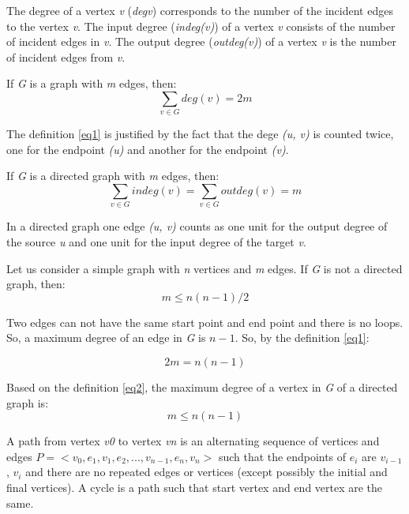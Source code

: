 \documentclass[a4paper]{article}
\begin{document}
    The degree of a vertex \emph{v} (\emph{deg{v}}) corresponds to 
    the number of the incident edges to the vertex \emph{v}.
    The input degree (\emph{indeg(v)}) of a vertex \emph{v} consists 
    of the number of incident edges in \emph{v}.
    The output degree (\emph{outdeg(v)}) of a vertex \emph{v} is the 
    number of incident edges from \emph{v}.

    If \emph{G} is a graph with \emph{m} edges, then:
    \begin{equation} \label{eq1}
        \sum_{v \in G} deg(v) = 2m
    \end{equation}

    The definition \ref{eq1} is justified by the fact that the dege 
    \emph{(u, v)} is counted twice, one for the endpoint \emph{(u)} and 
    another for the endpoint \emph{(v)}.

    If \emph{G} is a directed graph with \emph{m} edges, then:
    \begin{equation} \label{eq2}
        \sum_{v \in G} indeg(v) = \sum_{v \in G} outdeg(v) = m
    \end{equation}

    In a directed graph one edge \emph{(u, v)} counts as one unit 
    for the output degree of the source \emph{u} and one unit for
    the input degree of the target \emph{v}.

    Let us consider a simple graph with \emph{n} vertices and \emph{m} 
    edges. If \emph{G} is not a directed graph, then:
    \begin{equation} \label{eq3}
        m \le n(n - 1) / 2 
    \end{equation}

    Two edges can not have the same start point and end point and there 
    is no loops. So, a maximum degree of an edge in \emph{G} is $n - 1$. 
    So, by the definition \ref{eq1}:

    \begin{equation} \label{eq4}
        2m = n(n - 1)
    \end{equation}

    Based on the definition \ref{eq2}, the maximum degree of a vertex in \emph{G}
    of a directed graph is:
    \begin{equation}
        m \le n(n-1)
    \end{equation}
    


    A path from vertex \emph{v0} to vertex \emph{vn} is an alternating sequence of 
    vertices and edges $ P =< v_0, e_1, v_1, e_2, ..., v_{n-1}, e_n, v_n > $
    such that the endpoints of $ e_i $ are $ v_{i-1} $, $ v_i $ and there are no 
    repeated edges or vertices (except possibly the initial and final vertices).
    A cycle is a path such that start vertex and end vertex are the same.
\end{document}
